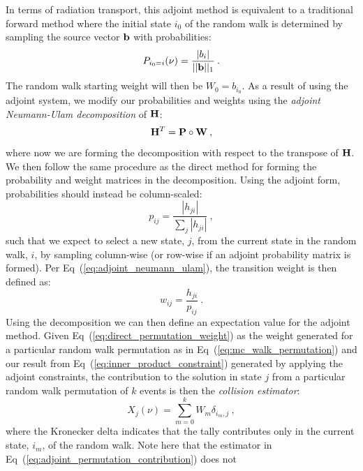 In terms of radiation transport, this adjoint method is equivalent to
a traditional forward method where the initial state $i_0$ of the
random walk is determined by sampling the source vector $\mathbf{b}$ with
probabilities:
\begin{equation}
  P_{i_0=i}(\nu) = \frac{|b_i|}{||\mathbf{b}||_1}\:.
  \label{eq:adjoint_source_probability}
\end{equation}
The random walk starting weight will then be $W_0 = b_{i_0}$.  As a
result of using the adjoint system, we modify our probabilities and
weights using the \textit{adjoint Neumann-Ulam decomposition} of
$\mathbf{H}$:
\begin{equation}
  \mathbf{H}^{T} = \mathbf{P} \circ \mathbf{W}\:,
  \label{eq:adjoint_neumann_ulam}
\end{equation}
where now we are forming the decomposition with respect to the
transpose of $\mathbf{H}$. We then follow the same procedure as the direct
method for forming the probability and weight matrices in the
decomposition. Using the adjoint form, probabilities should instead be
column-scaled:
\begin{equation}
  p_{ij} = \frac{|h_{ji}|}{\sum_j |h_{ji}|}\:,
  \label{eq:adjoint_probability}
\end{equation}
such that we expect to select a new state, $j$, from the current state
in the random walk, $i$, by sampling column-wise (or row-wise if an
adjoint probability matrix is formed). Per
Eq~(\ref{eq:adjoint_neumann_ulam}), the transition weight is then
defined as:
\begin{equation}
  w_{ij} = \frac{h_{ji}}{p_{ij}}\:.
  \label{eq:adjoint_weight}
\end{equation}
Using the decomposition we can then define an expectation value for
the adjoint method. Given Eq~(\ref{eq:direct_permutation_weight}) as
the weight generated for a particular random walk permutation as in
Eq~(\ref{eq:mc_walk_permutation}) and our result from
Eq~(\ref{eq:inner_product_constraint}) generated by applying the
adjoint constraints, the contribution to the solution in state $j$
from a particular random walk permutation of $k$ events is then the
\textit{collision estimator}:
\begin{equation}
  X_{j}(\nu) = \sum_{m=0}^k W_{m} \delta_{i_m,j}\:,
  \label{eq:adjoint_permutation_contribution}
\end{equation}
where the Kronecker delta indicates that the tally contributes only in
the current state, $i_m$, of the random walk.  Note here that the
estimator in Eq~(\ref{eq:adjoint_permutation_contribution}) does not

